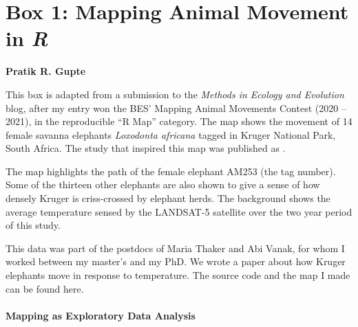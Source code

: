
\pagestyle{plain}
\pagecolor{Snow2}

	\medskip
	\section*{Box 1: Mapping Animal Movement in \textit{R}}\label{box:mapping}

	\medskip

	\noindent \textbf{Pratik R. Gupte}

	\medskip

	\noindent {\large{$\Delta$}} \small{This box is adapted from a submission to the \textit{Methods in Ecology and Evolution} blog, after my entry won the BES' Mapping Animal Movements Contest (2020 -- 2021), in the reproducible ``R Map'' category. The map shows the movement of 14 female savanna elephants \textit{Loxodonta africana} tagged in Kruger National Park, South Africa.
	The study that inspired this map was published as \citet{thaker2019} .}

	\medskip

	The map highlights the path of the female elephant AM253 (the tag number). Some of the thirteen other elephants are also shown to give a sense of how densely Kruger is criss-crossed by elephant herds. The background shows the average temperature sensed by the LANDSAT-5 satellite over the two year period of this study.

	This data was part of the postdocs of Maria Thaker and Abi Vanak, for whom I worked between my master's and my PhD. We wrote a paper about how Kruger elephants move in response to temperature. The source code and the map I made can be found here.

	\paragraph*{Mapping as Exploratory Data Analysis}


